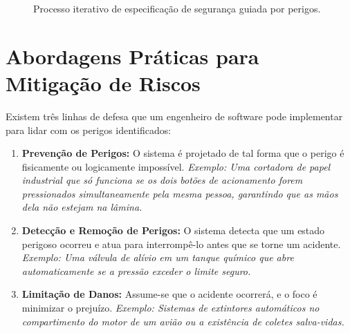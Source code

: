 \documentclass[12pt,a4paper]{report}
\begin{document}
\begin{figure}[h]
    \centering
    \caption{Processo iterativo de especificação de segurança guiada por perigos.}
\end{figure}

\section{Abordagens Práticas para Mitigação de Riscos}

Existem três linhas de defesa que um engenheiro de software pode implementar para lidar com os perigos identificados:

\begin{enumerate}
    \item \textbf{Prevenção de Perigos:} O sistema é projetado de tal forma que o perigo é fisicamente ou logicamente impossível.
    \textit{Exemplo: Uma cortadora de papel industrial que só funciona se os dois botões de acionamento forem pressionados simultaneamente pela mesma pessoa, garantindo que as mãos dela não estejam na lâmina.}
    \item \textbf{Detecção e Remoção de Perigos:} O sistema detecta que um estado perigoso ocorreu e atua para interrompê-lo antes que se torne um acidente.
    \textit{Exemplo: Uma válvula de alívio em um tanque químico que abre automaticamente se a pressão exceder o limite seguro.}
    \item \textbf{Limitação de Danos:} Assume-se que o acidente ocorrerá, e o foco é minimizar o prejuízo.
    \textit{Exemplo: Sistemas de extintores automáticos no compartimento do motor de um avião ou a existência de coletes salva-vidas.}
\end{enumerate}
\end{document}
